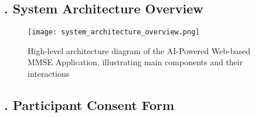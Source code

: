 \newpage
{}
\subsection*{. System Architecture Overview} \label{appendix:system-architecture}
\begin{figure}[h]
\centering
\texttt{[image: system\_architecture\_overview.png]}
\caption{High-level architecture diagram of the AI-Powered Web-based MMSE Application, illustrating main components and their interactions}
\label{fig:high-level-architecture}
\end{figure}


\newpage
{}
\subsection*{. Participant Consent Form} \label{appendix:concent}

